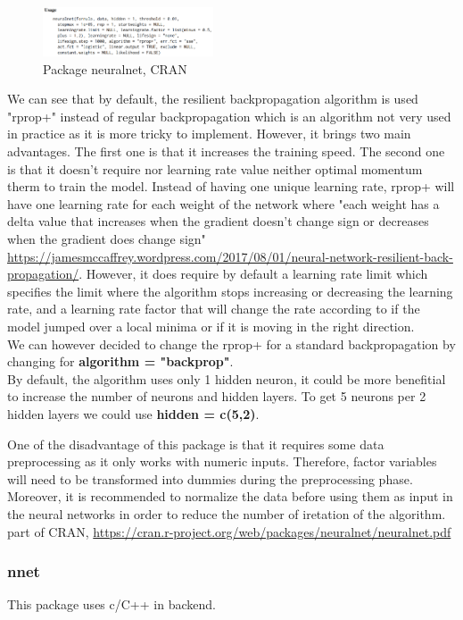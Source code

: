 \documentclass[6pt,letter]{article}\usepackage[]{graphicx}\usepackage[]{color}
\begin{document}
\begin{figure}[h]
    \centering
    \includegraphics[width=0.45\textwidth]{neuralnet_package.png}
     \caption{Package neuralnet, CRAN}
\end{figure}

We can see that by default, the resilient backpropagation algorithm is used "rprop+" instead of regular backpropagation which is an algorithm not very used in practice as it is more tricky to implement. However, it brings two main advantages. The first one is that it increases the training speed. The second one is that it doesn't require nor learning rate value neither optimal momentum therm to train the model. Instead of having one unique learning rate, rprop+ will have one learning rate for each weight of the network where "each weight has a delta value that increases when the gradient doesn't change sign or decreases when the gradient does change sign" \url{https://jamesmccaffrey.wordpress.com/2017/08/01/neural-network-resilient-back-propagation/}. However, it does require by default a learning rate limit which specifies the limit where the algorithm stops increasing or decreasing the learning rate, and a learning rate factor that will change the rate according to if the model jumped over a local minima or if it is moving in the right direction.\\
We can however decided to change the rprop+ for a standard backpropagation by changing for \textbf{algorithm = "backprop"}.\\

By default, the algorithm uses only 1 hidden neuron, it could be more benefitial to increase the number of neurons and hidden layers. To get 5 neurons per 2 hidden layers we could use \textbf{hidden = c(5,2)}.


One of the disadvantage of this package is that it requires some data preprocessing as it only works with numeric inputs. Therefore, factor variables will need to be transformed into dummies during the preprocessing phase. Moreover, it is recommended to normalize the data before using them as input in the neural networks in order to reduce the number of iretation of the algorithm.
part of CRAN, \url{https://cran.r-project.org/web/packages/neuralnet/neuralnet.pdf}

\subsubsection{nnet}
This package uses c/C++ in backend.
\end{document}
